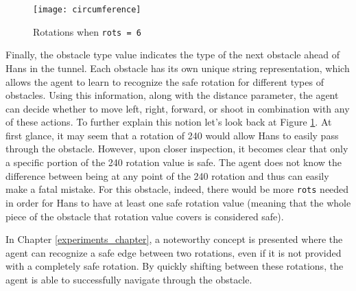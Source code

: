 \begin{figure}[h]
    \centering
    \texttt{[image: circumference]}
    \caption{Rotations when \texttt{rots = 6}}
    \label{fig:circumference}
\end{figure}

Finally, the obstacle type value indicates the type of the next obstacle ahead of Hans in the tunnel. Each obstacle has its own unique string representation, which allows the agent to learn to recognize the safe rotation for different types of obstacles. Using this information, along with the distance parameter, the agent can decide whether to move left, right, forward, or shoot in combination with any of these actions. To further explain this notion let's look back at Figure \ref{fig:circumference}. At first glance, it may seem that a rotation of 240 would allow Hans to easily pass through the obstacle. However, upon closer inspection, it becomes clear that only a specific portion of the 240 rotation value is safe. The agent does not know the difference between being at any point of the 240 rotation and thus can easily make a fatal mistake. For this obstacle, indeed, there would be more \texttt{rots} needed in order for Hans to have at least one safe rotation value (meaning that the whole piece of the obstacle that rotation value covers is considered safe).

In Chapter \ref{experiments_chapter}, a noteworthy concept is presented where the agent can recognize a safe edge between two rotations, even if it is not provided with a completely safe rotation. By quickly shifting between these rotations, the agent is able to successfully navigate through the obstacle.


